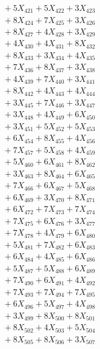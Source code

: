 \documentclass[a4paper,10pt]{article}
\begin{document}
{\begin{align}
&\;  + 5 X_{421} + 5 X_{422} + 3 X_{423} \\[0.3ex]
&\;  + 8 X_{424} + 7 X_{425} + 3 X_{426} \\[0.3ex]
&\;  + 8 X_{427} + 4 X_{428} + 3 X_{429} \\[0.5ex]\allowbreak
&\;  + 4 X_{430} + 4 X_{431} + 8 X_{432} \\[0.3ex]
&\;  + 8 X_{433} + 3 X_{434} + 4 X_{435} \\[0.3ex]
&\;  + 7 X_{436} + 8 X_{437} + 3 X_{438} \\[0.3ex]
&\;  + 4 X_{439} + 7 X_{440} + 3 X_{441} \\[0.3ex]
&\;  + 8 X_{442} + 4 X_{443} + 4 X_{444} \\[0.3ex]
&\;  + 3 X_{445} + 7 X_{446} + 3 X_{447} \\[0.3ex]
&\;  + 3 X_{448} + 4 X_{449} + 6 X_{450} \\[0.3ex]
&\;  + 3 X_{451} + 5 X_{452} + 5 X_{453} \\[0.3ex]
&\;  + 6 X_{454} + 8 X_{455} + 4 X_{456} \\[0.3ex]
&\;  + 7 X_{457} + 5 X_{458} + 4 X_{459} \\[0.5ex]\allowbreak
&\;  + 5 X_{460} + 6 X_{461} + 8 X_{462} \\[0.3ex]
&\;  + 3 X_{463} + 8 X_{464} + 6 X_{465} \\[0.3ex]
&\;  + 7 X_{466} + 6 X_{467} + 5 X_{468} \\[0.3ex]
&\;  + 6 X_{469} + 3 X_{470} + 8 X_{471} \\[0.3ex]
&\;  + 6 X_{472} + 7 X_{473} + 7 X_{474} \\[0.3ex]
&\;  + 7 X_{475} + 6 X_{476} + 3 X_{477} \\[0.3ex]
&\;  + 7 X_{478} + 4 X_{479} + 6 X_{480} \\[0.3ex]
&\;  + 5 X_{481} + 7 X_{482} + 6 X_{483} \\[0.3ex]
&\;  + 6 X_{484} + 4 X_{485} + 6 X_{486} \\[0.3ex]
&\;  + 5 X_{487} + 5 X_{488} + 6 X_{489} \\[0.5ex]\allowbreak
&\;  + 7 X_{490} + 6 X_{491} + 4 X_{492} \\[0.3ex]
&\;  + 7 X_{493} + 7 X_{494} + 7 X_{495} \\[0.3ex]
&\;  + 6 X_{496} + 5 X_{497} + 4 X_{498} \\[0.3ex]
&\;  + 3 X_{499} + 8 X_{500} + 8 X_{501} \\[0.3ex]
&\;  + 8 X_{502} + 4 X_{503} + 5 X_{504} \\[0.3ex]
&\;  + 8 X_{505} + 8 X_{506} + 3 X_{507} \\[0.3ex]

\end{align}}
\end{document}
